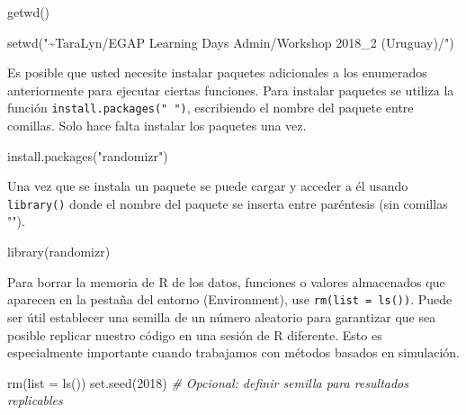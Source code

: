 \documentclass[
  12pt,
  spanish,
]{book}
\newenvironment{Shaded}{\begin{snugshade}}{\end{snugshade}}
\newcommand{\AttributeTok}[1]{\textcolor[rgb]{0.77,0.63,0.00}{#1}}
\newcommand{\CommentTok}[1]{\textcolor[rgb]{0.56,0.35,0.01}{\textit{#1}}}
\newcommand{\DecValTok}[1]{\textcolor[rgb]{0.00,0.00,0.81}{#1}}
\newcommand{\FunctionTok}[1]{\textcolor[rgb]{0.00,0.00,0.00}{#1}}
\newcommand{\NormalTok}[1]{#1}
\newcommand{\StringTok}[1]{\textcolor[rgb]{0.31,0.60,0.02}{#1}}
\begin{document}
\begin{Shaded}
\begin{Highlighting}[]
\FunctionTok{getwd}\NormalTok{()}
\end{Highlighting}
\end{Shaded}

\begin{Shaded}
\begin{Highlighting}[]
\FunctionTok{setwd}\NormalTok{(}\StringTok{"\textasciitilde{}TaraLyn/EGAP Learning Days Admin/Workshop 2018\_2 (Uruguay)/"}\NormalTok{)}
\end{Highlighting}
\end{Shaded}

Es posible que usted necesite instalar paquetes adicionales a los enumerados anteriormente para ejecutar ciertas funciones. Para instalar paquetes se utiliza la función \texttt{install.packages("\ ")}, escribiendo el nombre del paquete entre comillas. Solo hace falta instalar los paquetes una vez.

\begin{Shaded}
\begin{Highlighting}[]
\FunctionTok{install.packages}\NormalTok{(}\StringTok{"randomizr"}\NormalTok{)}
\end{Highlighting}
\end{Shaded}

Una vez que se instala un paquete se puede cargar y acceder a él usando \texttt{library()} donde el nombre del paquete se inserta entre paréntesis (sin comillas "").

\begin{Shaded}
\begin{Highlighting}[]
\FunctionTok{library}\NormalTok{(randomizr)}
\end{Highlighting}
\end{Shaded}

Para borrar la memoria de R de los datos, funciones o valores almacenados que aparecen en la pestaña del entorno (Environment), use \texttt{rm(list\ =\ ls())}. Puede ser útil establecer una semilla de un número aleatorio para garantizar que sea posible replicar nuestro código en una sesión de R diferente. Esto es especialmente importante cuando trabajamos con métodos basados en simulación.

\begin{Shaded}
\begin{Highlighting}[]
\FunctionTok{rm}\NormalTok{(}\AttributeTok{list =} \FunctionTok{ls}\NormalTok{())}
\FunctionTok{set.seed}\NormalTok{(}\DecValTok{2018}\NormalTok{) }\CommentTok{\# Opcional: definir semilla para resultados replicables}
\end{Highlighting}
\end{Shaded}
\end{document}
